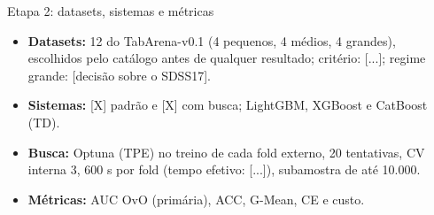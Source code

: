 \documentclass[aspectratio=169,11pt]{beamer}
\begin{document}

\begin{frame}{Etapa 2: datasets, sistemas e métricas}
    \begin{itemize}
        \item \textbf{Datasets:} 12 do TabArena-v0.1 (4 pequenos, 4 médios, 4 grandes), escolhidos pelo catálogo antes de qualquer resultado; critério: [...]; regime grande: [decisão sobre o SDSS17].
        \item \textbf{Sistemas:} [X] padrão e [X] com busca; LightGBM, XGBoost e CatBoost (TD).
        \item \textbf{Busca:} Optuna (TPE) no treino de cada fold externo, 20 tentativas, CV interna 3, 600 s por fold (tempo efetivo: [...]), subamostra de até 10.000.
        \item \textbf{Métricas:} AUC OvO (primária), ACC, G-Mean, CE e custo.
    \end{itemize}
\end{frame}
\end{document}
